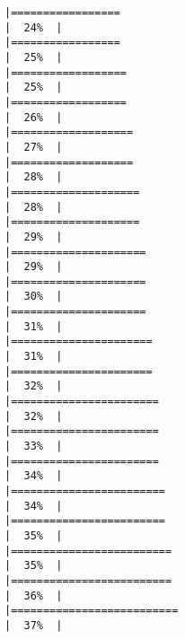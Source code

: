 \documentclass[
]{article}
\begin{document}
\begin{verbatim}
|=================                                                     |  24%  |                                                                              |=================                                                     |  25%  |                                                                              |==================                                                    |  25%  |                                                                              |==================                                                    |  26%  |                                                                              |===================                                                   |  27%  |                                                                              |===================                                                   |  28%  |                                                                              |====================                                                  |  28%  |                                                                              |====================                                                  |  29%  |                                                                              |=====================                                                 |  29%  |                                                                              |=====================                                                 |  30%  |                                                                              |=====================                                                 |  31%  |                                                                              |======================                                                |  31%  |                                                                              |======================                                                |  32%  |                                                                              |=======================                                               |  32%  |                                                                              |=======================                                               |  33%  |                                                                              |=======================                                               |  34%  |                                                                              |========================                                              |  34%  |                                                                              |========================                                              |  35%  |                                                                              |=========================                                             |  35%  |                                                                              |=========================                                             |  36%  |                                                                              |==========================                                            |  37%  |                                                                              
\end{verbatim}
\end{document}
